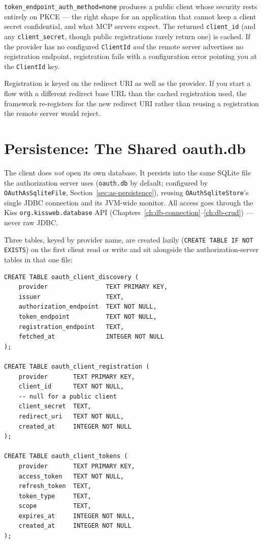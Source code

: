 \noindent
\texttt{token\_endpoint\_auth\_method=none} produces a public client whose security rests entirely on PKCE --- the right shape for an application that cannot keep a client secret confidential, and what MCP servers expect.  The returned \texttt{client\_id} (and any \texttt{client\_secret}, though public registrations rarely return one) is cached.  If the provider has no configured \texttt{ClientId} \emph{and} the remote server advertises no registration endpoint, registration fails with a configuration error pointing you at the \texttt{ClientId} key.

\begin{notebox}
Registration is keyed on the redirect URI as well as the provider.  If you start a flow with a different redirect base URL than the cached registration used, the framework re-registers for the new redirect URI rather than reusing a registration the remote server would reject.
\end{notebox}

\section{Persistence: The Shared oauth.db}
\label{sec:oc-persistence}

The client does \emph{not} open its own database.  It persists into the same SQLite file the authorization server uses (\texttt{oauth.db} by default; configured by \texttt{OAuthAsSqliteFile}, Section~\ref{sec:as-persistence}), reusing \texttt{OAuthSqliteStore}'s single JDBC connection and its JVM-wide monitor.  All access goes through the Kiss \texttt{org.kissweb.database} API (Chapters~\ref{ch:db-connection}--\ref{ch:db-crud}) --- never raw JDBC.

Three tables, keyed by provider name, are created lazily (\texttt{CREATE TABLE IF NOT EXISTS}) on the first client read or write and sit alongside the authorization-server tables in that one file:

\begin{lstlisting}[style=sql]
CREATE TABLE oauth_client_discovery (
    provider                TEXT PRIMARY KEY,
    issuer                  TEXT,
    authorization_endpoint  TEXT NOT NULL,
    token_endpoint          TEXT NOT NULL,
    registration_endpoint   TEXT,
    fetched_at              INTEGER NOT NULL
);

CREATE TABLE oauth_client_registration (
    provider       TEXT PRIMARY KEY,
    client_id      TEXT NOT NULL,
    -- null for a public client
    client_secret  TEXT,
    redirect_uri   TEXT NOT NULL,
    created_at     INTEGER NOT NULL
);

CREATE TABLE oauth_client_tokens (
    provider       TEXT PRIMARY KEY,
    access_token   TEXT NOT NULL,
    refresh_token  TEXT,
    token_type     TEXT,
    scope          TEXT,
    expires_at     INTEGER NOT NULL,
    created_at     INTEGER NOT NULL
);
\end{lstlisting}

